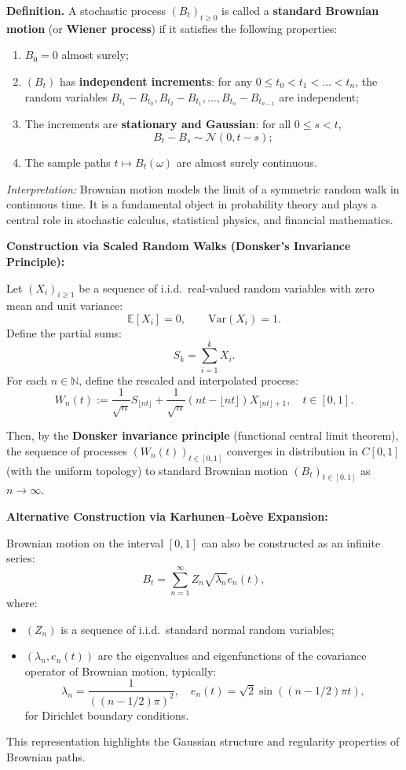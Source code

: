 
\textbf{Definition.}  
A stochastic process \( (B_t)_{t \geq 0} \) is called a \textbf{standard Brownian motion} (or \textbf{Wiener process}) if it satisfies the following properties:
\begin{enumerate}
  \item \( B_0 = 0 \) almost surely;
  \item \( (B_t) \) has \textbf{independent increments}: for any \( 0 \leq t_0 < t_1 < \dots < t_n \), the random variables \( B_{t_1} - B_{t_0}, B_{t_2} - B_{t_1}, \dots, B_{t_n} - B_{t_{n-1}} \) are independent;
  \item The increments are \textbf{stationary and Gaussian}: for all \( 0 \leq s < t \),  
  \[
  B_t - B_s \sim \mathcal{N}(0, t - s);
  \]
  \item The sample paths \( t \mapsto B_t(\omega) \) are almost surely continuous.
\end{enumerate}

\textit{Interpretation:}  
Brownian motion models the limit of a symmetric random walk in continuous time. It is a fundamental object in probability theory and plays a central role in stochastic calculus, statistical physics, and financial mathematics.

\vspace{1em}
\textbf{Construction via Scaled Random Walks (Donsker's Invariance Principle):}  

Let \( (X_i)_{i \geq 1} \) be a sequence of i.i.d.\ real-valued random variables with zero mean and unit variance:
\[
\mathbb{E}[X_i] = 0, \qquad \mathrm{Var}(X_i) = 1.
\]
Define the partial sums:
\[
S_k = \sum_{i=1}^k X_i.
\]
For each \( n \in \mathbb{N} \), define the rescaled and interpolated process:
\[
W_n(t) := \frac{1}{\sqrt{n}} S_{\lfloor nt \rfloor} + \frac{1}{\sqrt{n}} (nt - \lfloor nt \rfloor) X_{\lfloor nt \rfloor + 1}, \quad t \in [0,1].
\]

Then, by the \textbf{Donsker invariance principle} (functional central limit theorem), the sequence of processes \( (W_n(t))_{t \in [0,1]} \) converges in distribution in \( C[0,1] \) (with the uniform topology) to standard Brownian motion \( (B_t)_{t \in [0,1]} \) as \( n \to \infty \).

\vspace{1em}
\textbf{Alternative Construction via Karhunen–Loève Expansion:}

Brownian motion on the interval \( [0,1] \) can also be constructed as an infinite series:
\[
B_t = \sum_{n=1}^\infty Z_n \sqrt{\lambda_n} e_n(t),
\]
where:
\begin{itemize}
  \item \( (Z_n) \) is a sequence of i.i.d.\ standard normal random variables;
  \item \( (\lambda_n, e_n(t)) \) are the eigenvalues and eigenfunctions of the covariance operator of Brownian motion, typically:
  \[
  \lambda_n = \frac{1}{((n - 1/2)\pi)^2}, \quad e_n(t) = \sqrt{2} \sin\left( (n - 1/2)\pi t \right),
  \]
  for Dirichlet boundary conditions.
\end{itemize}
This representation highlights the Gaussian structure and regularity properties of Brownian paths.

